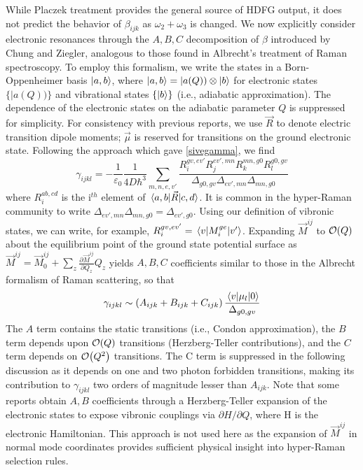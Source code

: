 \documentclass[aip, jcp, reprint, onecolumn]{revtex4-2}
\begin{document}
While Placzek treatment provides the general source of HDFG output, it does not predict the behavior of $\beta_{ijk}$ as $\omega_2 + \omega_3$ is changed.
We now explicitly consider electronic resonances through the $A,B,C$ decomposition of $\beta$ introduced by Chung and Ziegler, analogous to those found in Albrecht's treatment of Raman spectroscopy.\cite{Albrecht1961, Ziegler1988} 
To employ this formalism, we write the states in a Born-Oppenheimer basis $\ket{a,b}$, where $\ket{a,b} = |a(Q)) \otimes \ket{b}$ for electronic states $\{|a(Q))\}$ and vibrational states $\{\ket{b}\}$ (i.e., adiabatic approximation). \cite{BornOppenheimer, Tang1970}
The dependence of the electronic states on the adiabatic parameter $Q$ is suppressed for simplicity.
For consistency with previous reports, we use $\vec{R}$ to denote electric transition dipole moments; $\vec{\mu}$ is reserved for transitions on the ground electronic state. \cite{Tang1970}
Following the approach which gave \autoref{sivegamma}, we find
\begin{equation}\label{drgamma_notaylor}
	\gamma_{ijkl} = -\frac{1}{\varepsilon_0} \frac{1}{4D \hbar^3} \sum_{m,n,e,v'} \frac{
		R_{i}^{gv, ev'} 
		R_{j}^{ev',mn} 
		R_{k}^{mn,g0} 
		R_{l}^{g0,gv} 
	}{\Delta_{g0,gv}
		\Delta_{ev', mn}
		\Delta_{mn, g0}
	}
\end{equation}
where $R_{i}^{ab,cd}$ is the i$^{th}$ element of $\mel{a,b}{\vec{R}}{c,d}$.
It is common in the hyper-Raman community to write $\Delta_{ev', mn} \Delta_{mn, g0} = \Delta_{ev', g0}$.
Using our definition of vibronic states, we can write, for example,
$R_{i}^{gv,ev'} = \mel{v}{M_i^{ge}}{v'}$.
Expanding $\vec{M}^{ij}$ to $\order{Q}$ about the equilibrium point of the ground state potential surface as
$\vec{M}^{ij} = \vec{M}^{ij}_0 + \sum_z \frac{\partial\vec{M}^{ij}}{\partial Q_z} Q_z$
yields $A, B, C$ coefficients similar to those in the Albrecht formalism of Raman scattering, \cite{Albrecht1961, Ziegler1988} so that
\begin{equation}
		\gamma_{ijkl} \sim \left(A_{ijk} + B_{ijk} + C_{ijk}\right) \frac{\mel{v}{\mu_{l}}{0}} {\Delta_{g0,gv}}
\end{equation}
The $A$ term contains the static transitions (i.e., Condon approximation), the $B$ term depends upon $\order{Q}$ transitions (Herzberg-Teller contributions), and the $C$ term depends on $\order{Q^2}$ transitions. 
The C term is suppressed in the following discussion as it depends on one and two photon forbidden transitions, making its contribution to $\gamma_{ijkl}$ two orders of magnitude lesser than $A_{ijk}$. \cite{Ziegler1988, Neddersen1989, Bonang1992}
Note that some reports obtain $A, B$ coefficients through a Herzberg-Teller expansion of the electronic states to expose vibronic couplings via $\partial H / \partial Q$, where H is the electronic Hamiltonian.\cite{HerzbergTeller1933, Petrov1985, Neddersen1989, Baranov1990}
This approach is not used here as the expansion of $\vec{M}^{ij}$ in normal mode coordinates provides sufficient physical insight into hyper-Raman selection rules. 
\end{document}
